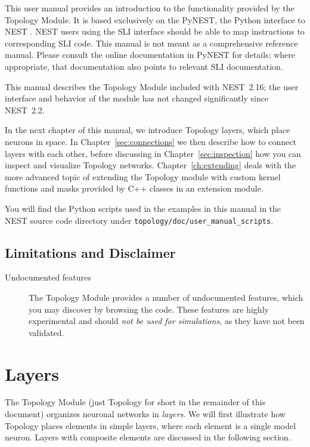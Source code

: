 \documentclass[a4paper,12pt]{report}
\begin{document}
This user manual provides an introduction to the functionality
provided by the Topology Module. It is based exclusively on the
PyNEST, the Python interface to NEST \citep{Eppl:2008(12)}. NEST users
using the SLI interface should be able to map instructions to
corresponding SLI code. This manual is not meant as a comprehensive
reference manual. Please consult the online documentation in PyNEST
for details; where appropriate, that documentation also points to
relevant SLI documentation.

This manual describes the Topology Module included with NEST~2.16;
the user interface and behavior of the module has not changed
significantly since NEST~2.2.

In the next chapter of this manual, we introduce Topology layers,
which place neurons in space. In Chapter~\ref{sec:connections} we then
describe how to connect layers with each other, before discussing in
Chapter~\ref{sec:inspection} how you can inspect and visualize
Topology networks. Chapter~\ref{ch:extending} deals with the more advanced
topic of extending the Topology module with custom kernel functions and
masks provided by C++ classes in an extension module.

You will find the Python scripts used in the examples in this manual
 in the NEST
source code directory under \lstinline!topology/doc/user_manual_scripts!.

\section{Limitations and Disclaimer}\label{sec:limitations}

\begin{description}
\item[Undocumented features] The Topology Module provides a number of undocumented features, which
you may discover by browsing the code. These features are highly
experimental and should \emph{not be used for simulations}, as they
have not been validated.
\end{description}




\chapter{Layers}\label{sec:layers}

The Topology Module (just Topology for short in the remainder of this
document) organizes neuronal networks in \emph{layers}. We will first
illustrate how Topology places elements in simple layers, where each
element is a single model neuron. Layers with composite elements are
discussed in the following section.
\end{document}

